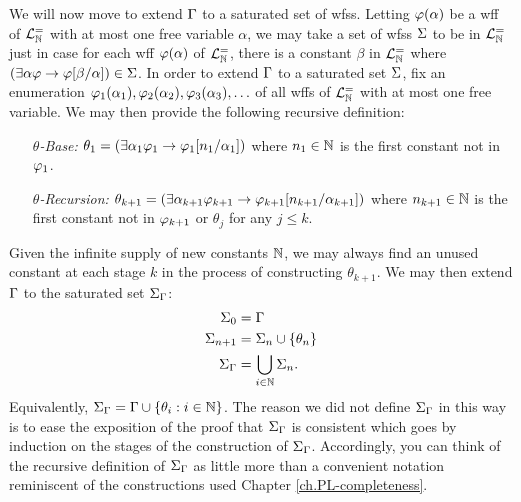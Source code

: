 We will now move to extend $\Gamma$ to a saturated set of wfss.
Letting $\varphi(\alpha)$ be a wff of $\mathcal{L}^{=}_{\mathbb{N}}$ with at most one free variable $\alpha$, we may take a set of wfss $\Sigma$ to be  in $\mathcal{L}^{=}_{\mathbb{N}}$ just in case for each wff $\varphi(\alpha)$ of $\mathcal{L}^{=}_{\mathbb{N}}$, there is a constant $\beta$ in $\mathcal{L}^{=}_{\mathbb{N}}$ where $(\exists \alpha\varphi \rightarrow \varphi[\beta/\alpha])\in\Sigma$.
In order to extend $\Gamma$ to a saturated set $\Sigma$, fix an enumeration $\varphi_1(\alpha_1),\varphi_2(\alpha_2),\varphi_3(\alpha_3),\ldots$ of all wffs of $\mathcal{L}^{=}_{\mathbb{N}}$ with at most one free variable. %
We may then provide the following recursive definition:
\begin{enumerate}[leftmargin=1in]
  \item[\it $\theta$-Base:] $\theta_1=(\exists \alpha_1\varphi_1\rightarrow \varphi_1[n_1/\alpha_1])$ where $n_1\in\mathbb{N}$ is the first constant not in $\varphi_1$.
  \item[\it $\theta$-Recursion:] $\theta_{k+1}=(\exists \alpha_{k+1}\varphi_{k+1}\rightarrow \varphi_{k+1}[n_{k+1}/\alpha_{k+1}])$  where $n_{k+1}\in\mathbb{N}$ is the first constant not in $\varphi_{k+1}$ or $\theta_j$ for any $j\leq k$.
\end{enumerate}
Given the infinite supply of new constants $\mathbb{N}$, we may always find an unused constant at each stage $k$ in the process of constructing $\theta_{k+1}$.
We may then extend $\Gamma$ to the saturated set $\Sigma_{\Gamma}$:
\begin{align*}
  \label{name}
  \Sigma_0     &= \Gamma\\
  \Sigma_{n+1} &= \Sigma_n\cup\lbrace\theta_n\rbrace\\
  \Sigma_{\Gamma} &= \bigcup_{i\in\mathbb{N}}\Sigma_n.
\end{align*}
Equivalently, $\Sigma_{\Gamma}=\Gamma\cup\lbrace\theta_i:i\in\mathbb{N}\rbrace$.
The reason we did not define $\Sigma_{\Gamma}$ in this way is to ease the exposition of the proof that $\Sigma_{\Gamma}$ is consistent which goes by induction on the stages of the construction of $\Sigma_{\Gamma}$. 
Accordingly, you can think of the recursive definition of $\Sigma_{\Gamma}$ as little more than a convenient notation reminiscent of the constructions used Chapter \ref{ch.PL-completeness}.

